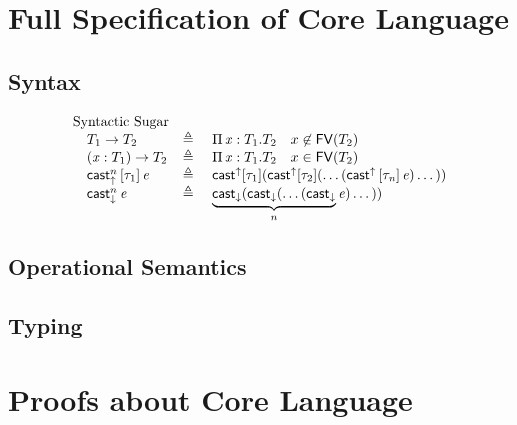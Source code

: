 \newcommand{\FV}{\mathsf{FV}}
\newcommand{\dom}{\mathsf{dom}}

\section{Full Specification of Core Language}

\subsection{Syntax}
\gram{\otte\ottinterrule
        \ottG\ottinterrule
        \ottv}
\[
    \begin{array}{llll}
     \text{Syntactic Sugar}\\
     \quad T_{{\mathrm{1}}}  \rightarrow  T_{{\mathrm{2}}} & \triangleq & \Pi \, \ottmv{x}  \ottsym{:}  T_{{\mathrm{1}}}  \ottsym{.}  T_{{\mathrm{2}}} \quad x \not \in \FV(T_{{\mathrm{2}}}) \\
     \quad \ottsym{(}  \ottmv{x}  \ottsym{:}  T_{{\mathrm{1}}}  \ottsym{)}  \rightarrow  T_{{\mathrm{2}}} & \triangleq & \Pi \, \ottmv{x}  \ottsym{:}  T_{{\mathrm{1}}}  \ottsym{.}  T_{{\mathrm{2}}} \quad x \in \FV(T_{{\mathrm{2}}}) \\
     \quad \kw{cast}_{\uparrow}^n \, \ottsym{[}  \tau_{{\mathrm{1}}}  \ottsym{]} \,  \ottnt{e} &  \triangleq ~  &  \kw{cast}^{\uparrow}  [ \tau_{{\mathrm{1}}} ] ( \kw{cast}^{\uparrow}  [ \tau_{{\mathrm{2}}} ] (\dots ( \kw{cast}^{\uparrow} \, \ottsym{[}  \tau_{\ottmv{n}}  \ottsym{]} \,  \ottnt{e} ) \dots )) \\
     \quad \kw{cast}_{\downarrow}^n \, \ottnt{e} &  \triangleq ~  & \underbrace{ \kw{cast}_{\downarrow}  ( \kw{cast}_{\downarrow}  (\dots (  \kw{cast}_{\downarrow} }_n \ottnt{e}) \dots ))
    \end{array}
\]

\subsection{Operational Semantics}
\ottdefnstep{}
\ottusedrule{\ottdruleSXXMu{}}

\subsection{Typing}
\ottdefnctx{}
\ottdefnexpr{}
\ottusedrule{\ottdruleTXXMu{}}

\section{Proofs about Core Language}
